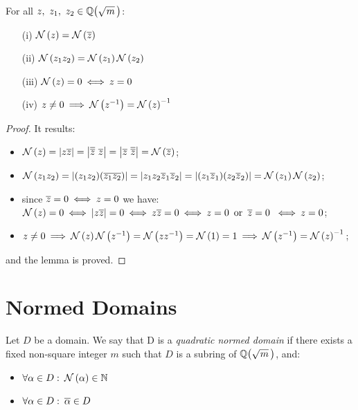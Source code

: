 \begin{lem}\label{norm} For all
$z,\ z_1,\ z_2\in \QQ{m}$:

\begin{itemize}
\item[{\rm (i)}] 
$\Norm{z} = \Norm{\cg z}$

\item[{\rm (ii)}]
$\Norm{z_1z_2} = \Norm{z_1}\Norm{z_2}$

\item[{\rm (iii)}]
$\Norm{z} = 0 \iff z = 0$

\item[{\rm (iv)}]
$z \not= 0 \then \Norm{z^{-1}} = {\Norm{z}}^{-1}$
\end{itemize}
\end{lem}

\begin{proof}
%
It results:
%
\begin{itemize}

\item

$\Norm{z} = \abs{z\cg z} = \abs{\cg{\cg z}\ \cg z} =
\abs{\cg z\ \cg{\cg z}} = \Norm{\cg z}$;

\item

$\Norm{z_1z_2} = \abs{(z_1z_2) (\cg{z_1z_2})} =
\abs{z_1z_2 \cg z_1 \cg z_2} =
\abs{(z_1\cg z_1) (z_2 \cg z_2)} = \Norm{z_1}\Norm{z_2}$;


\item

since $\cg z = 0 \iff z = 0$ we have:\\
\mbox{$\Norm{z} = 0 \iff \abs{z\cg z} = 0 \iff
z\cg z = 0 \iff z = 0\,\ {\rm or}\,\ \cg z = 0\ \iff
z = 0$;}

\item

$z\not=0 \then \Norm{z} \Norm{z^{-1}} = \Norm{zz^{-1}} =
\Norm{1} = 1 \then \Norm{z^{-1}} = {\Norm{z}}^{-1}$;

\end{itemize}
and the lemma is proved.
\end{proof}
%

\section{Normed Domains}\label{normed_domains}

\begin{defn}\label{normedDomain}
Let $D$ be a domain. We say that D is a \emph{quadratic
normed domain\/} if there exists a fixed non-square integer
$m$ such that $D$ is a subring of $\QQ{m}$, and:
\begin{itemize}
\item $\forall \alpha\in D:\: \Norm{\alpha} \in \N$
\item $\forall \alpha\in D:\: \cg{\alpha} \in D$
\end{itemize}
\end{defn}

